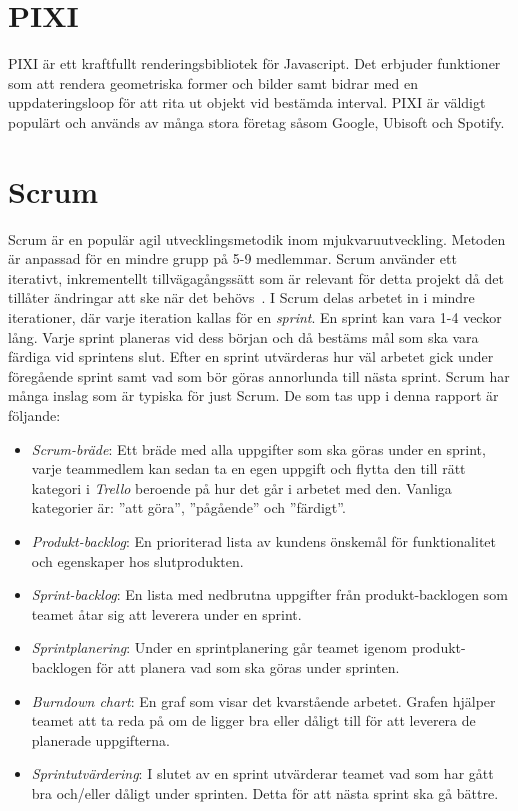\section{PIXI}
PIXI är ett kraftfullt renderingsbibliotek för Javascript. Det erbjuder funktioner som att rendera geometriska former och bilder samt bidrar med en uppdateringsloop för att rita ut objekt vid bestämda interval. PIXI är väldigt populärt och används av många stora företag såsom Google, Ubisoft och Spotify.~\cite{Pixi}

\section{Scrum}
\label{theory:scrum}
Scrum är en populär agil utvecklingsmetodik inom mjukvaruutveckling. Metoden är anpassad för en mindre grupp på 5-9 medlemmar. Scrum använder ett iterativt, inkrementellt tillvägagångssätt som är relevant för detta projekt då det tillåter ändringar att ske när det behövs~\cite{TheScrum}. I Scrum delas arbetet in i mindre iterationer, där varje iteration kallas för en \textit{sprint}. En sprint kan vara 1-4 veckor lång. Varje sprint planeras vid dess början och då bestäms mål som ska vara färdiga vid sprintens slut. Efter en sprint utvärderas hur väl arbetet gick under föregående sprint samt vad som bör göras annorlunda till nästa sprint. Scrum har många inslag som är typiska för just Scrum. De som tas upp i denna rapport är följande:

\begin{itemize}
	\item \textit{Scrum-bräde}: Ett bräde med alla uppgifter som ska göras under en sprint, varje teammedlem kan sedan ta en egen uppgift och flytta den till rätt kategori i \textit{Trello} beroende på hur det går i arbetet med den. Vanliga kategorier är: ''att göra'', ''pågående'' och ''färdigt''.

	\item \textit{Produkt-backlog}: En prioriterad lista av kundens önskemål för funktionalitet och egenskaper hos slutprodukten.

	\item \textit{Sprint-backlog}: En lista med nedbrutna uppgifter från produkt-backlogen som teamet åtar sig att leverera under en sprint.

	\item \textit{Sprintplanering}: Under en sprintplanering går teamet igenom produkt-backlogen för att planera vad som ska göras under sprinten. 

	\item \textit{Burndown chart}: En graf som visar det kvarstående arbetet. Grafen hjälper teamet att ta reda på om de ligger bra eller dåligt till för att leverera de planerade uppgifterna.

	\item \textit{Sprintutvärdering}: I slutet av en sprint utvärderar teamet vad som har gått bra och/eller dåligt under sprinten. Detta för att nästa sprint ska gå bättre.

\end{itemize}

